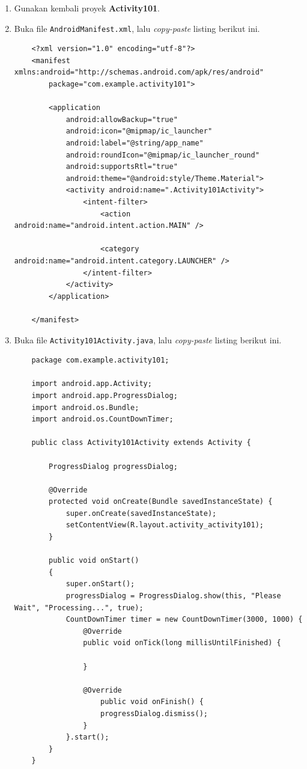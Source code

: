\documentclass{scrartcl}
\begin{document}
\begin{enumerate}
	\item Gunakan kembali proyek \textbf{Activity101}.
	
	\item Buka file \texttt{AndroidManifest.xml}, lalu \textit{copy-paste} listing berikut ini.
	
	\begin{verbatim}
	<?xml version="1.0" encoding="utf-8"?>
	<manifest xmlns:android="http://schemas.android.com/apk/res/android"
		package="com.example.activity101">
		
		<application
			android:allowBackup="true"
			android:icon="@mipmap/ic_launcher"
			android:label="@string/app_name"
			android:roundIcon="@mipmap/ic_launcher_round"
			android:supportsRtl="true"
			android:theme="@android:style/Theme.Material">
			<activity android:name=".Activity101Activity">
				<intent-filter>
					<action android:name="android.intent.action.MAIN" />
					
					<category android:name="android.intent.category.LAUNCHER" />
				</intent-filter>
			</activity>
		</application>
		
	</manifest>
	\end{verbatim}
	
	\item Buka file \texttt{Activity101Activity.java}, lalu \textit{copy-paste} listing berikut ini.
	
	\begin{verbatim}
	package com.example.activity101;
	
	import android.app.Activity;
	import android.app.ProgressDialog;
	import android.os.Bundle;
	import android.os.CountDownTimer;
	
	public class Activity101Activity extends Activity {
	
		ProgressDialog progressDialog;
		
		@Override
		protected void onCreate(Bundle savedInstanceState) {
			super.onCreate(savedInstanceState);
			setContentView(R.layout.activity_activity101);
		}
		
		public void onStart()
		{
			super.onStart();
			progressDialog = ProgressDialog.show(this, "Please Wait", "Processing...", true);
			CountDownTimer timer = new CountDownTimer(3000, 1000) {
				@Override
				public void onTick(long millisUntilFinished) {
				
				}
				
				@Override
					public void onFinish() {
					progressDialog.dismiss();
				}
			}.start();
		}
	}
	

\end{verbatim}
\end{enumerate}
\end{document}

